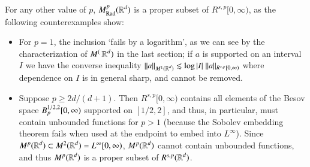 For any other value of $p$, $M^p_{\text{Rad}}(\operatorname{\mathbb{R}}^d)$ is a proper subset of $R^{s,p}[0,\infty)$, as the following counterexamples show:
%
\begin{itemize}
  \item For $p = 1$, the inclusion `fails by a logarithm', as we can see by the characterization of $M^(\operatorname{\mathbb{R}}^d)$ in the last section; if $a$ is supported on an interval $I$ we have the converse inequality $\| a \|_{M^1(\operatorname{\mathbb{R}}^d)} \lesssim \log |I|\; \| a \|_{R^{s,p}[0,\infty)}$ where dependence on $I$ is in general sharp, and cannot be removed.

  \item Suppose $p \geq 2d/(d+1)$. Then $R^{s,p}[0,\infty)$ contains all elements of the Besov space $B^{{\tiny 1/2},2}_p[0,\infty)$ supported on $[1/2,2]$, and thus, in particular, must contain unbounded functions for $p > 1$ (because the Sobolev embedding theorem fails when used at the endpoint to embed into $L^\infty$). Since $M^p(\operatorname{\mathbb{R}}^d) \subset M^2(\operatorname{\mathbb{R}}^d) = L^\infty[0,\infty)$, $M^p(\operatorname{\mathbb{R}}^d)$ cannot contain unbounded functions, and thus $M^p(\operatorname{\mathbb{R}}^d)$ is a proper subset of $R^{s,p}(\operatorname{\mathbb{R}}^d)$.









\end{itemize}
